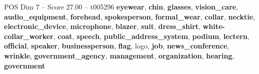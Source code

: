 \begin{textsample}{POS Dim 7 – Score 27.00 – t005296}  \label{ex:f7_pos_033}
\textbf{eyewear}, \textbf{chin}, \textbf{glasses}, \textbf{vision\_care}, \textbf{audio\_equipment}, \textbf{forehead}, \textbf{spokesperson}, \textbf{formal\_wear}, \textbf{collar}, \textbf{necktie}, \textbf{electronic\_device}, \textbf{microphone}, \textbf{blazer}, \textbf{suit}, \textbf{dress\_shirt}, \textbf{white-collar\_worker}, \textbf{coat}, \textbf{speech}, \textbf{public\_address\_system}, \textbf{podium}, \textbf{lectern}, \textbf{official}, \textbf{speaker}, \textbf{businessperson}, \textbf{flag}, logo, \textbf{job}, \textbf{news\_conference}, \textbf{wrinkle}, \textbf{government\_agency}, \textbf{management}, \textbf{organization}, \textbf{hearing}, \textbf{government}

\end{textsample}
